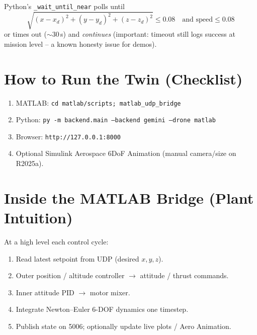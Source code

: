 \documentclass[11pt,a4paper]{article}
\begin{document}
Python's \texttt{\_wait\_until\_near} polls until
\[
\sqrt{(x-x_d)^2+(y-y_d)^2+(z-z_d)^2} \le 0.08
\quad\text{and speed}\le 0.08
\]
or times out ($\sim$30\,s) and \emph{continues} (important: timeout still logs success at mission
level -- a known honesty issue for demos).

\section{How to Run the Twin (Checklist)}

\begin{enumerate}[itemsep=2pt]
\item MATLAB: \texttt{cd matlab/scripts; matlab\_udp\_bridge}
\item Python: \texttt{py -m backend.main --backend gemini --drone matlab}
\item Browser: \texttt{http://127.0.0.1:8000}
\item Optional Simulink Aerospace 6DoF Animation (manual camera/size on R2025a).
\end{enumerate}

\begin{center}
\end{center}

\section{Inside the MATLAB Bridge (Plant Intuition)}

At a high level each control cycle:
\begin{enumerate}[itemsep=2pt]
\item Read latest setpoint from UDP (desired $x,y,z$).
\item Outer position / altitude controller $\to$ attitude / thrust commands.
\item Inner attitude PID $\to$ motor mixer.
\item Integrate Newton--Euler 6-DOF dynamics one timestep.
\item Publish state on 5006; optionally update live plots / Aero Animation.
\end{enumerate}
\end{document}

